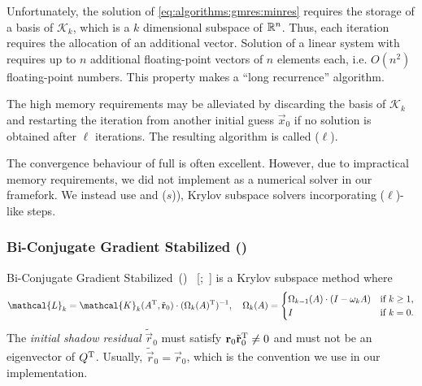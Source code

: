 Unfortunately, the solution of \cref{eq:algorithms:gmres:minres}
requires the storage of a basis of $\mathcal{K}_k$, which is a $k$
dimensional subspace of $\mathbb{R}^n$. Thus, each iteration requires the
allocation of an additional vector. Solution of a linear system with
 requires up to $n$ additional floating-point vectors of
$n$ elements each, i.e. $O(n^2)$ floating-point numbers. This property
makes  a ``long recurrence'' algorithm.

The high memory requirements may be alleviated by discarding the basis
of $\mathcal{K}_k$ and restarting the iteration from another initial
guess $\vec{x}_0$ if no solution is obtained after $\ell$
iterations. The resulting algorithm is called ($\ell$).

The convergence behaviour of full  is often
excellent. However, due to impractical memory requirements, we did not
implement  as a numerical solver in our framefork.  We
instead use  and
($s$)), Krylov subspace solvers
incorporating ($\ell$)-like steps.

\subsubsection{Bi-Conjugate Gradient Stabilized ()}
\label{ssec:algorithms:bicgstab}

Bi-Conjugate Gradient Stabilized~()%
~\mkbibbrackets{;~}
is a Krylov subspace method where~\citep{simoncini2010interpreting}
\begin{equation}
  \label{eq:algorithms:bicgstab:stabpoly}
  \mathcal{L}_k = \mathcal{K}_k(A^\T, \tilde{\vec{r}}_0) \cdot
  (\Omega_k(A)^\T)^{-1}, \quad
  \Omega_k(A) = \begin{cases}
    \Omega_{k - 1}(A) \cdot (I - \omega_k A) & \text{if $k \ge 1$,} \\
    I & \text{if $k = 0$.}
  \end{cases}
\end{equation}
The \emph{initial shadow residual} $\tilde{\vec{r}}_0$ must satisfy
$\bm{\mathrm{r}}_0 \tilde{\bm{\mathrm{r}}}_0^{\mathrm{T}} \ne 0$ and must not be an eigenvector
of $Q^{\mathrm{T}}$. Usually, $\tilde{\vec{r}}_0 = \vec{r}_0$, which is the
convention we use in our implementation.

